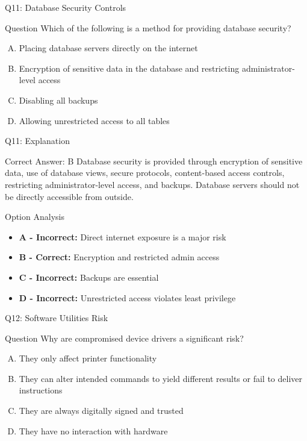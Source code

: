 \documentclass{beamer}
\begin{document}
	\begin{frame}{Q11: Database Security Controls}
		\begin{block}{Question}
			Which of the following is a method for providing database security?
		\end{block}
		\begin{enumerate}[(A)]
			\item Placing database servers directly on the internet
			\item Encryption of sensitive data in the database and restricting administrator-level access
			\item Disabling all backups
			\item Allowing unrestricted access to all tables
		\end{enumerate}
	\end{frame}
	
	\begin{frame}{Q11: Explanation}
		\begin{block}{Correct Answer: B}
			Database security is provided through encryption of sensitive data, use of database views, secure protocols, content-based access controls, restricting administrator-level access, and backups. Database servers should not be directly accessible from outside.
		\end{block}
		\begin{block}{Option Analysis}
			\begin{itemize}
				\item \textbf{A - Incorrect:} Direct internet exposure is a major risk
				\item \textbf{B - Correct:} Encryption and restricted admin access
				\item \textbf{C - Incorrect:} Backups are essential
				\item \textbf{D - Incorrect:} Unrestricted access violates least privilege
			\end{itemize}
		\end{block}
	\end{frame}
	
	\begin{frame}{Q12: Software Utilities Risk}
		\begin{block}{Question}
			Why are compromised device drivers a significant risk?
		\end{block}
		\begin{enumerate}[(A)]
			\item They only affect printer functionality
			\item They can alter intended commands to yield different results or fail to deliver instructions
			\item They are always digitally signed and trusted
			\item They have no interaction with hardware
		\end{enumerate}
	\end{frame}
	
\end{document}
